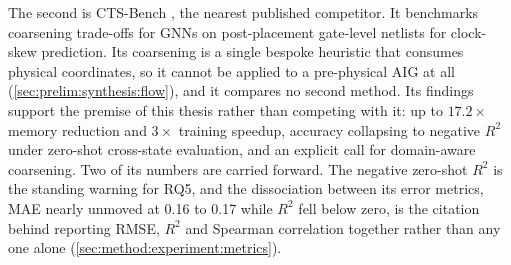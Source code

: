 The second is CTS-Bench \citep{cts_bench2026}, the nearest published competitor. It
benchmarks coarsening trade-offs for GNNs on post-placement gate-level netlists for
clock-skew prediction. Its coarsening is a single bespoke heuristic that consumes
physical coordinates, so it cannot be applied to a pre-physical AIG at all
(\ref{sec:prelim:synthesis:flow}), and it compares no second method. Its findings support
the premise of this thesis rather than competing with it: up to $17.2\times$ memory
reduction and $3\times$ training speedup, accuracy collapsing to negative $R^2$ under
zero-shot cross-state evaluation, and an explicit call for domain-aware coarsening. Two
of its numbers are carried forward. The negative zero-shot $R^2$ is the standing warning
for RQ5, and the dissociation between its error metrics, MAE nearly unmoved at 0.16 to
0.17 while $R^2$ fell below zero, is the citation behind reporting RMSE, $R^2$ and
Spearman correlation together rather than any one alone
(\ref{sec:method:experiment:metrics}).
